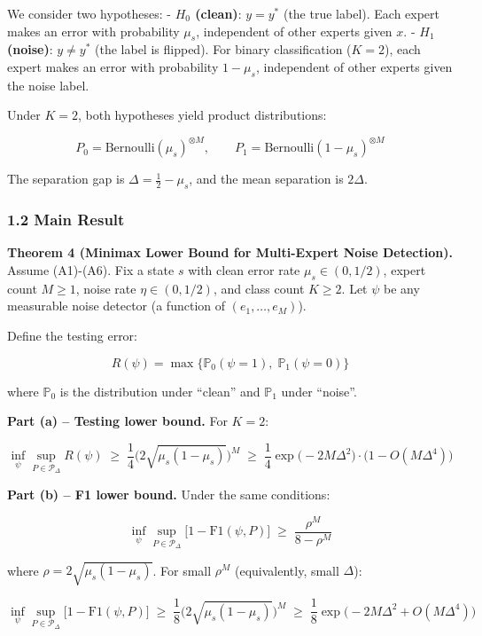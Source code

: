 \documentclass[
  12pt,
]{article}
\begin{document}
We consider two hypotheses: - \textbf{\(H_0\) (clean)}: \(y = y^*\) (the
true label). Each expert makes an error with probability \(\mu_s\),
independent of other experts given \(x\). - \textbf{\(H_1\) (noise)}:
\(y \neq y^*\) (the label is flipped). For binary classification
(\(K=2\)), each expert makes an error with probability \(1 - \mu_s\),
independent of other experts given the noise label.

Under \(K=2\), both hypotheses yield product distributions:

\[P_0 = \text{Bernoulli}(\mu_s)^{\otimes M}, \qquad
P_1 = \text{Bernoulli}(1 - \mu_s)^{\otimes M}\]

The separation gap is \(\Delta = \tfrac12 - \mu_s\), and the mean
separation is \(2\Delta\).

\subsubsection{1.2 Main Result}\label{main-result}

\textbf{Theorem 4 (Minimax Lower Bound for Multi-Expert Noise
Detection).} Assume (A1)-(A6). Fix a state \(s\) with clean error rate
\(\mu_s \in (0, 1/2)\), expert count \(M \geq 1\), noise rate
\(\eta \in (0, 1/2)\), and class count \(K \geq 2\). Let \(\psi\) be any
measurable noise detector (a function of \((e_1,\dots,e_M)\)).

Define the testing error:

\[R(\psi) = \max\bigl\{\mathbb{P}_0(\psi = 1),\; \mathbb{P}_1(\psi = 0)\bigr\}\]

where \(\mathbb{P}_0\) is the distribution under ``clean'' and
\(\mathbb{P}_1\) under ``noise''.

\textbf{Part (a) -- Testing lower bound.} For \(K=2\):

\[\inf_{\psi} \sup_{P \in \mathcal{P}_{\Delta}} R(\psi)
\;\geq\; \frac14 \bigl(2\sqrt{\mu_s(1-\mu_s)}\bigr)^M
\;\geq\; \frac14 \exp\!\bigl(-2M\Delta^2\bigr) \cdot \bigl(1 - O(M\Delta^4)\bigr)\]

\textbf{Part (b) -- F1 lower bound.} Under the same conditions:

\[\inf_{\psi} \sup_{P \in \mathcal{P}_{\Delta}} \bigl[1 - \text{F1}(\psi, P)\bigr]
\;\geq\; \frac{\rho^M}{8-\rho^M}\]

where \(\rho = 2\sqrt{\mu_s(1-\mu_s)}\). For small \(\rho^M\)
(equivalently, small \(\Delta\)):

\[\inf_{\psi} \sup_{P \in \mathcal{P}_{\Delta}} \bigl[1 - \text{F1}(\psi, P)\bigr]
\;\geq\; \frac18 \bigl(2\sqrt{\mu_s(1-\mu_s)}\bigr)^M
\;\geq\; \frac18 \exp\!\bigl(-2M\Delta^2 + O(M\Delta^4)\bigr)\]
\end{document}
